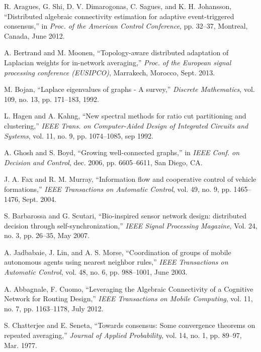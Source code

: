 \documentclass[10pt,twocolumn]{IEEEtran}
\begin{document}
\begin{thebibliography}{1}
R. Aragues, G. Shi, D. V. Dimarogonas, C. Sagues, and K. H. Johansson, ``Distributed algebraic connectivity estimation for adaptive event-triggered consensus,'' in {\it Proc. of the American Control Conference}, pp. 32--37, Montreal, Canada, June 2012.

A. Bertrand and M. Moonen, ``Topology-aware distributed adaptation of Laplacian weights for in-network averaging,'' {\it Proc. of the European signal processing conference (EUSIPCO)}, Marrakech, Morocco, Sept. 2013.



M. Bojan, ``Laplace eigenvalues of graphs - A survey,'' {\it Discrete Mathematics},
vol. 109, no. 13, pp. 171--183, 1992.

L. Hagen and A. Kahng, ``New spectral methods for ratio cut partitioning and clustering,'' {\it IEEE Trans. on Computer-Aided Design of Integrated Circuits and Systems}, vol. 11, no. 9, pp. 1074--1085, sep 1992.

A. Ghosh and S. Boyd, ``Growing well-connected graphs,'' in {\it IEEE Conf. on Decision and Control}, dec. 2006, pp. 6605--6611, San Diego, CA.

J. A. Fax and R. M. Murray, ``Information flow and cooperative control of vehicle formations,'' {\it IEEE Transactions on Automatic Control}, vol. 49, no. 9, pp. 1465--1476, Sept. 2004.

S. Barbarossa and G. Scutari, ``Bio-inspired sensor network design: distributed
decision through self-synchronization,'' {\it IEEE Signal Processing Magazine}, Vol. 24, no. 3, pp. 26--35, May 2007.

A. Jadbabaie, J. Lin, and A. S. Morse, ``Coordination of groups of mobile autonomous agents using nearest neighbor rules,'' {\it IEEE Transactions on Automatic Control}, vol. 48, no. 6, pp. 988--1001, June 2003.

A. Abbagnale, F. Cuomo, ``Leveraging the Algebraic Connectivity of a Cognitive Network for Routing Design,'' {\it IEEE Transactions on Mobile Computing}, vol. 11, no. 7, pp. 1163--1178, July 2012.

S. Chatterjee and E. Seneta, ``Towards consensus: Some convergence theorems on repeated averaging,'' {\it Journal of Applied Probability}, vol. 14, no. 1, pp. 89--97, Mar. 1977.




\end{thebibliography}
\end{document}
